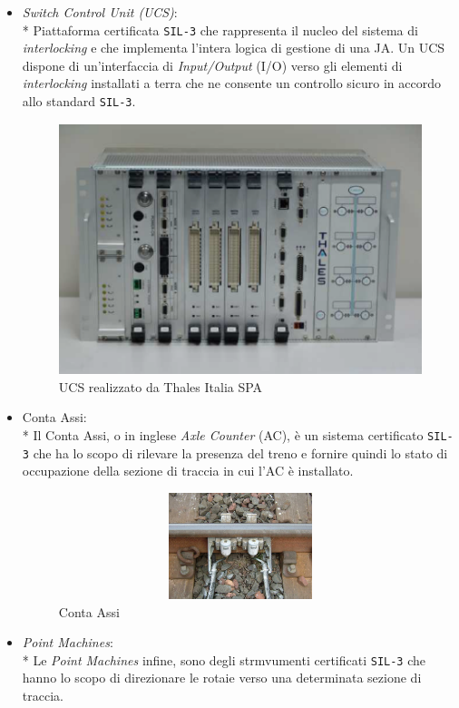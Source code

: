 \begin{itemize}
	\item \emph{Switch Control Unit (UCS)}:\\*
	Piattaforma certificata \texttt{SIL-3} che rappresenta il nucleo del sistema di \emph{interlocking} e che implementa l'intera logica di gestione di una JA. Un UCS dispone di un'interfaccia di \emph{Input/Output} (I/O) verso gli elementi di \emph{interlocking} installati a terra che ne consente un controllo sicuro in accordo allo standard \texttt{SIL-3}.
\begin{figure}[h]
		\centering
		\includegraphics[width=0.7\linewidth]{img/ucs}
		\caption{UCS realizzato da Thales Italia SPA}
		\label{fig:ucs}
\end{figure}
	\item Conta Assi:\\*
	Il Conta Assi, o in inglese \emph{Axle Counter} (AC), \`e un sistema certificato \texttt{SIL-3} che ha lo scopo di rilevare la presenza del treno e fornire quindi lo stato di occupazione della sezione di traccia in cui l'AC \`e installato.
\begin{figure}[h]
	\centering
	\includegraphics[width=11cm,height=3.1cm]{img/axlecounter}
	\caption{Conta Assi}
	\label{fig:ac}
\end{figure}
	\item \emph{Point Machines}:\\*
	Le \emph{Point Machines} infine, sono degli strmvumenti certificati \texttt{SIL-3} che hanno lo scopo di direzionare le rotaie verso una determinata sezione di traccia.
	\begin{figure}[h]

\end{figure}
\end{itemize}
